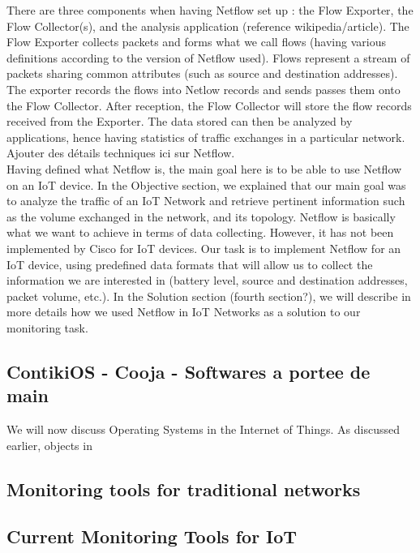 There are three components when having Netflow set up : the Flow Exporter, the Flow Collector(s), and the analysis application (reference wikipedia/article). The Flow Exporter collects packets and forms what we call flows (having various definitions according to the version of Netflow used). Flows represent a stream of packets sharing common attributes (such as source and destination addresses). The exporter records the flows into Netlow records and sends passes them onto the Flow Collector. After reception, the Flow Collector will store the flow records received from the Exporter. The data stored can then be analyzed by applications, hence having statistics of traffic exchanges in a particular network.\\

Ajouter des détails techniques ici sur Netflow.\\

Having defined what Netflow is, the main goal here is to be able to use Netflow on an IoT device. In the Objective section, we explained that our main goal was to analyze the traffic of an IoT Network and retrieve pertinent information such as the volume exchanged in the network, and its topology. Netflow is basically what we want to achieve in terms of data collecting. However, it has not been implemented by Cisco for IoT devices. Our task is to implement Netflow for an IoT device, using predefined data formats that will allow us to collect the information we are interested in (battery level, source and destination addresses, packet volume, etc.). In the Solution section (fourth section?), we will describe in more details how we used Netflow in IoT Networks as a solution to our monitoring task.

\subsection{ContikiOS - Cooja - Softwares a portee de main}
We will now discuss Operating Systems in the Internet of Things. As discussed earlier, objects in 
\subsection{Monitoring tools for traditional networks}

\subsection{Current Monitoring Tools for IoT}

